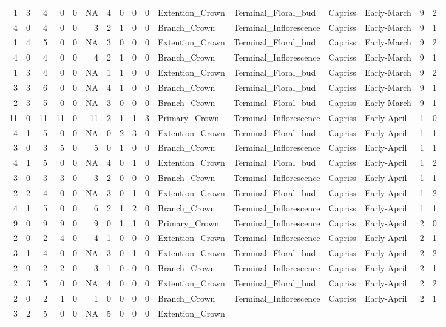 \documentclass[]{article}
\begin{document}
\begin{longtable}[]{@{}rrrrrrrrrrllllrl@{}}
1 & 3 & 4 & 0 & 0 & NA & 4 & 0 & 0 & 0 & Extention\_Crown &
Terminal\_Floral\_bud & Capriss & Early-March & 9 & 2\tabularnewline
4 & 0 & 4 & 0 & 0 & 3 & 2 & 1 & 0 & 0 & Branch\_Crown &
Terminal\_Inflorescence & Capriss & Early-March & 9 & 1\tabularnewline
1 & 4 & 5 & 0 & 0 & NA & 3 & 0 & 0 & 0 & Extention\_Crown &
Terminal\_Floral\_bud & Capriss & Early-March & 9 & 2\tabularnewline
4 & 0 & 4 & 0 & 0 & 4 & 2 & 1 & 0 & 0 & Branch\_Crown &
Terminal\_Inflorescence & Capriss & Early-March & 9 & 1\tabularnewline
1 & 3 & 4 & 0 & 0 & NA & 1 & 1 & 0 & 0 & Extention\_Crown &
Terminal\_Floral\_bud & Capriss & Early-March & 9 & 2\tabularnewline
3 & 3 & 6 & 0 & 0 & NA & 4 & 1 & 0 & 0 & Branch\_Crown &
Terminal\_Floral\_bud & Capriss & Early-March & 9 & 1\tabularnewline
2 & 3 & 5 & 0 & 0 & NA & 3 & 0 & 0 & 0 & Branch\_Crown &
Terminal\_Floral\_bud & Capriss & Early-March & 9 & 1\tabularnewline
11 & 0 & 11 & 11 & 0 & 11 & 2 & 1 & 1 & 3 & Primary\_Crown &
Terminal\_Inflorescence & Capriss & Early-April & 1 & 0\tabularnewline
4 & 1 & 5 & 0 & 0 & NA & 0 & 2 & 3 & 0 & Extention\_Crown &
Terminal\_Floral\_bud & Capriss & Early-April & 1 & 1\tabularnewline
3 & 0 & 3 & 5 & 0 & 5 & 0 & 1 & 0 & 0 & Branch\_Crown &
Terminal\_Inflorescence & Capriss & Early-April & 1 & 1\tabularnewline
4 & 1 & 5 & 0 & 0 & NA & 4 & 0 & 1 & 0 & Extention\_Crown &
Terminal\_Floral\_bud & Capriss & Early-April & 1 & 2\tabularnewline
3 & 0 & 3 & 3 & 0 & 3 & 2 & 0 & 0 & 0 & Branch\_Crown &
Terminal\_Inflorescence & Capriss & Early-April & 1 & 1\tabularnewline
2 & 2 & 4 & 0 & 0 & NA & 3 & 0 & 1 & 0 & Extention\_Crown &
Terminal\_Floral\_bud & Capriss & Early-April & 1 & 2\tabularnewline
4 & 1 & 5 & 0 & 0 & 6 & 2 & 1 & 2 & 0 & Branch\_Crown &
Terminal\_Inflorescence & Capriss & Early-April & 1 & 1\tabularnewline
9 & 0 & 9 & 9 & 0 & 9 & 0 & 1 & 1 & 0 & Primary\_Crown &
Terminal\_Inflorescence & Capriss & Early-April & 2 & 0\tabularnewline
2 & 0 & 2 & 4 & 0 & 4 & 1 & 0 & 0 & 0 & Extention\_Crown &
Terminal\_Inflorescence & Capriss & Early-April & 2 & 1\tabularnewline
3 & 1 & 4 & 0 & 0 & NA & 3 & 0 & 1 & 0 & Extention\_Crown &
Terminal\_Floral\_bud & Capriss & Early-April & 2 & 2\tabularnewline
2 & 0 & 2 & 2 & 0 & 3 & 1 & 0 & 0 & 0 & Branch\_Crown &
Terminal\_Inflorescence & Capriss & Early-April & 2 & 1\tabularnewline
2 & 3 & 5 & 0 & 0 & NA & 4 & 0 & 0 & 0 & Extention\_Crown &
Terminal\_Floral\_bud & Capriss & Early-April & 2 & 2\tabularnewline
2 & 0 & 2 & 1 & 0 & 1 & 0 & 0 & 0 & 0 & Branch\_Crown &
Terminal\_Inflorescence & Capriss & Early-April & 2 & 1\tabularnewline
3 & 2 & 5 & 0 & 0 & NA & 5 & 0 & 0 & 0 & Extention\_Crown &

\end{longtable}
\end{document}
